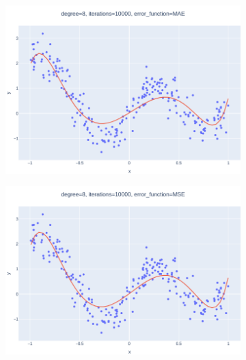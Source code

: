 \documentclass[14pt,a4]{article}
\begin{document}
\begin{figure}[h]
\begin{subfigure}{0.3\linewidth}
    \end{subfigure}
    \newline
    \begin{subfigure}{0.3\linewidth}
        \centering
        \includegraphics[width=\textwidth]{images/implementation/q1/part_c/8_10000_MAE.png}
    \end{subfigure}
    \hfill
    \begin{subfigure}{0.3\textwidth}
        \centering
        \includegraphics[width=\textwidth]{images/implementation/q1/part_c/8_10000_MSE.png}
    \end{subfigure}
    \hfill
    \begin{subfigure}{0.3\linewidth}
        \centering

\end{subfigure}
\end{figure}
\end{document}
